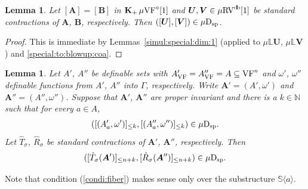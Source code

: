 \documentclass[12pt]{amsart}
\theoremstyle{plain}
\newtheorem{lem}[thm]{Lemma}
\theoremstyle{definition}
\theoremstyle{remark}
\numberwithin{equation}{section}
\theoremstyle{plain}
\newcommand{\VF}{\textup{VF}}
\newcommand{\RV}{\textup{RV}}
\newcommand{\N}{\mathds{N}}
\newcommand{\0}{\emptyset}
\newcommand{\bb}[1]{\mathbb{#1}}
\newcommand{\sub}{\subseteq}
\newcommand{\la}{\langle}
\newcommand{\ra}{\rangle}
\newcommand{\mVF}{{\mu}{\VF}}
\newcommand{\mRV}{{\mu}{\RV}}
\newcommand{\dsp}{\textup{D}_{\textup{sp}}}
\newcommand{\mispdb}{\mu \dsp}
\newcommand{\mL}{{\mu}{\bb L}}
\DeclareMathOperator{\gsk}{\mathbf{K}_+}
\DeclareMathOperator{\db}{d \! b}
\begin{document}
\begin{lem}\label{kernel:dim:1:coa}
Let $[\bm A] = [\bm B]$ in  $\gsk \mVF^{\diamond}[1]$ and $\bm U, \bm V \in \mRV^{\db}[1]$ be standard contractions of $\bm A$, $\bm B$, respectively. Then $([\bm U], [\bm V]) \in \mispdb$.
\end{lem}
\begin{proof}
This is immediate by Lemmas~\ref{simul:special:dim:1} (applied to $\mL \bm U$, $\mL \bm V$) and \ref{special:to:blowup:coa}.
\end{proof}

\begin{lem}\label{isp:VF:fiberwise:contract}
Let $A'$, $A''$ be definable sets with $A'_{\VF} = A''_{\VF} = A \sub \VF^n$ and $\omega'$, $\omega''$ definable functions from $A'$, $A''$ into $\Gamma$, respectively. Write $\bm A' = (A', \omega')$ and $\bm A'' = (A'', \omega'')$. Suppose that $\bm A'$, $\bm A''$ are proper invariant and there is a $k \in \N$ such that for  every $a \in A$,
\begin{equation}\label{condi:fiber}
([(A'_a, \omega')]_{\leq k}, [(A''_a, \omega'')]_{\leq k}) \in \mispdb.
\end{equation}
Let $\hat T_{\sigma}$, $\hat R_{\sigma}$ be standard contractions of $\bm A'$, $\bm A''$, respectively. Then
\[
([\hat T_{\sigma}(\bm A')]_{\leq n+k}, [\hat R_{\sigma}(\bm A'')]_{\leq n+k}) \in \mispdb.
\]
\end{lem}

Note that condition (\ref{condi:fiber}) makes sense only  over the substructure $\mathbb{S} \la a \ra$.
\end{document}
